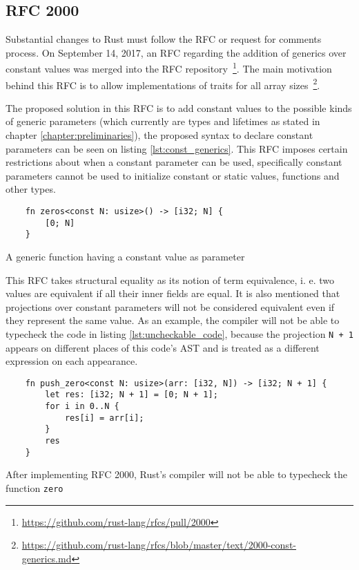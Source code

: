 \subsection{RFC 2000} 

Substantial changes to Rust must follow the RFC or request for comments process.
On September 14, 2017, an RFC regarding the addition of generics over constant
values was merged into the RFC
repository~\footnote{\url{https://github.com/rust-lang/rfcs/pull/2000}}. The
main motivation behind this RFC is to allow implementations of traits for all
array sizes~\footnote{\url{https://github.com/rust-lang/rfcs/blob/master/text/2000-const-generics.md}}. 

The proposed solution in this RFC is to add constant values to the possible
kinds of generic parameters (which currently are types and lifetimes as stated
in chapter \ref{chapter:preliminaries}), the proposed syntax to declare constant
parameters can be seen on listing \ref{lst:const_generics}. This RFC imposes
certain restrictions about when a constant parameter can be used, specifically
constant parameters cannot be used to initialize constant or static values,
functions and other types.

\begin{listing}[ht]
	\begin{verbatim}
    fn zeros<const N: usize>() -> [i32; N] {
        [0; N]
    }
	\end{verbatim}
    \caption{A generic function having a constant value as parameter}
  \label{lst:const_generics}
\end{listing}

This RFC takes structural equality as its notion of term equivalence, i. e. two
values are equivalent if all their inner fields are equal. It is also mentioned
that projections over constant parameters will not be considered equivalent even
if they represent the same value. As an example, the compiler will not be able
to typecheck the code in listing \ref{lst:uncheckable_code}, because the
projection \texttt{N + 1} appears on different places of this code's AST and is
treated as a different expression on each appearance.

\begin{listing}[ht]
	\begin{verbatim}
    fn push_zero<const N: usize>(arr: [i32, N]) -> [i32; N + 1] {
        let res: [i32; N + 1] = [0; N + 1];
        for i in 0..N {
            res[i] = arr[i];
        }
        res
    }
	\end{verbatim}
  \caption{After implementing RFC 2000, Rust's compiler will not be able to
  typecheck the function \texttt{zero}}
  \label{lst:uncheckable_code}
\end{listing}

